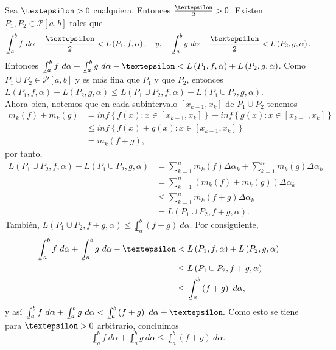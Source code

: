 Sea $\text{\textepsilon}>0$ cualquiera. Entonces $\frac{\text{\textepsilon}}{2}>0$. Existen $P_1,P_2\in\mathcal{P}\left[a,b\right]$ tales que
  \begin{equation*}
    \lowint_a^b f\ d\alpha - \frac{\text{\textepsilon}}{2} < L\left(P_1,f,\alpha\right),\quad y,\quad \lowint_a^b g\ d\alpha - \frac{\text{\textepsilon}}{2} < L\left(P_2,g,\alpha\right).
  \end{equation*}
  Entonces $\lowint_a^b f\ d\alpha + \lowint_a^b g\ d\alpha - \text{\textepsilon} < L\left(P_1,f,\alpha\right)+L\left(P_2,g,\alpha\right)$. Como $P_1\cup P_2 \in \mathcal{P}\left[a,b\right]$ y es más fina que $P_1$ y que $P_2$, entonces $L\left(P_1,f,\alpha\right)+L\left(P_2,g,\alpha\right) \leq L\left(P_1\cup P_2,f,\alpha\right)+L\left(P_1\cup P_2,g,\alpha\right)$.\\
  Ahora bien, notemos que en cada subintervalo $\left[x_{k-1},x_k\right]$ de $P_1\cup P_2$ tenemos
  \begin{align*}
    m_k\left(f\right)+m_k\left(g\right)&=inf\left\lbrace f\left(x\right): x\in\left[x_{k-1},x_k\right]\right\rbrace+inf\left\lbrace g\left(x\right): x\in\left[x_{k-1},x_k\right]\right\rbrace\\
    &\leq inf\left\lbrace f\left(x\right)+g\left(x\right): x\in\left[x_{k-1},x_k\right]\right\rbrace\\
    &=m_k\left(f+g\right),
  \end{align*}
por tanto,
\begin{align*}
  L\left(P_1\cup P_2, f, \alpha\right)+L\left(P_1\cup P_2, g, \alpha\right)&=\sum_{k=1}^{n} m_k\left(f\right)\Delta\alpha_k+\sum_{k=1}^{n} m_k\left(g\right)\Delta\alpha_k\\
  &=\sum_{k=1}^{n} \left(m_k\left(f\right)+m_k\left(g\right)\right)\Delta\alpha_k\\
  &\leq \sum_{k=1}^{n} m_k\left(f+g\right)\Delta\alpha_k\\
  &=L\left(P_1\cup P_2, f+g, \alpha\right).
\end{align*}
También, $L\left(P_1\cup P_2, f+g, \alpha\right)\leq \lowint_a^b\left(f+g\right)\ d\alpha$. Por consiguiente,
\begin{align*}
\lowint_a^b f\ d\alpha + \lowint_a^b g\ d\alpha - \text{\textepsilon} &< L\left(P_1,f,\alpha\right)+L\left(P_2,g,\alpha\right)\\
&\leq L\left(P_1\cup P_2, f+g, \alpha\right)\\
&\leq \lowint_a^b \left(f+g\right)\ d\alpha,
\end{align*}
y así $\lowint_a^b f\ d\alpha + \lowint_a^b g\ d\alpha < \lowint_a^b \left(f+g\right)\ d\alpha +  \text{\textepsilon}.$
Como esto se tiene para $\text{\textepsilon}>0$ arbitrario, concluimos
\begin{equation*}
\lowint_a^b f\ d\alpha + \lowint_a^b g\ d\alpha \leq \lowint_a^b \left(f+g\right)\ d\alpha.
\end{equation*}
